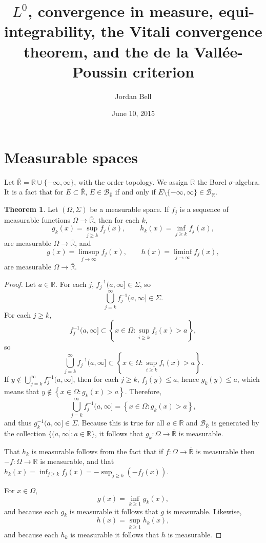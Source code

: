 \documentclass{article}
\theoremstyle{definition}
\newtheorem{theorem}{Theorem}
\theoremstyle{definition}
\begin{document}
\title{$L^0$, convergence in measure,  equi-integrability, the Vitali convergence theorem, and the de la Vall\'ee-Poussin criterion}
\author{Jordan Bell}
\date{June 10, 2015}

\maketitle

\section{Measurable spaces}
Let $\overline{\mathbb{R}}=\mathbb{R} \cup \{-\infty,\infty\}$, with the order topology.
We assign $\mathbb{R}$ the Borel $\sigma$-algebra. 
It is a fact that for $E \subset \overline{\mathbb{R}}$,
 $E \in \mathscr{B}_{\overline{\mathbb{R}}}$
if and only if  $E \setminus \{-\infty,\infty\} \in \mathscr{B}_{\mathbb{R}}$.


\begin{theorem}
Let $(\Omega,\Sigma)$ be a measurable space. 
If $f_j$ is a sequence of measurable functions $\Omega \to \overline{\mathbb{R}}$, then for each $k$,
\[
g_k(x)= \sup_{j \geq k} f_j(x), \qquad h_k(x)=  \inf_{j \geq k} f_j(x),
\]
are measurable $\Omega \to \overline{\mathbb{R}}$, and
\[
g(x) = \limsup_{j \to \infty} f_j(x), \qquad h(x) = \liminf_{j \to \infty} f_j(x),
\]
are measurable $\Omega \to \overline{\mathbb{R}}$.
\label{supmeasurable}
\end{theorem}
\begin{proof}
Let $a \in \mathbb{R}$. For each $j$, $f_j^{-1}(a,\infty] \in \Sigma$, so
\[
\bigcup_{j=k}^\infty f_j^{-1}(a,\infty] \in \Sigma.
\]
For each $j \geq k$,
\[
f_j^{-1}(a,\infty] \subset \left\{ x \in \Omega: \sup_{i \geq k} f_i(x) > a \right\},
\]
so
\[
\bigcup_{j=k}^\infty f_j^{-1}(a,\infty] \subset \left\{ x \in \Omega: \sup_{i \geq k} f_i(x) > a \right\}.
\]
If $y \not \in \bigcup_{j=k}^\infty f_j^{-1}(a,\infty]$, then for each $j \geq k$, $f_j(y) \leq a$, hence
$g_k(y) \leq a$, which means that
$y \not \in \left\{ x \in \Omega: g_k(x) > a \right\}$. Therefore,
\[
\bigcup_{j=k}^\infty f_j^{-1}(a,\infty]
=\left\{ x \in \Omega: g_k(x) > a \right\},
\]
and thus
$g_k^{-1}(a,\infty] \in \Sigma$. Because this is true for all $a \in \mathbb{R}$ and
$\mathscr{B}_{\overline{\mathbb{R}}}$ is generated by the collection 
$\{(a,\infty]: a \in \mathbb{R}\}$, it follows that $g_k:\Omega \to \overline{\mathbb{R}}$ is measurable. 

That $h_k$ is measurable follows from the fact that if $f:\Omega \to \overline{\mathbb{R}}$ is measurable
then $-f:\Omega \to \overline{\mathbb{R}}$ is measurable, and that
$h_k(x)=\inf_{j \geq k} f_j(x) = -\sup_{j \geq k} (-f_j(x))$. 

For $x \in \Omega$,
\[
g(x) = \inf_{k \geq 1} g_k(x),
\]
and because each $g_k$ is measurable it follows that $g$ is measurable. Likewise,
\[
h(x) = \sup_{k \geq 1} h_k(x),
\]
and because each $h_k$ is measurable it follows that $h$ is measurable.
\end{proof}
\end{document}
